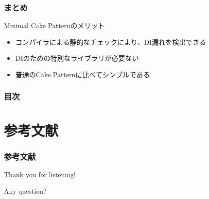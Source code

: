 \begin{frame}
  \frametitle{まとめ}
  
  \begin{block}{Minimal Cake Patternのメリット}
    \begin{itemize}
      \item<2-> コンパイラによる静的なチェックにより、DI漏れを検出できる
      \item<3-> DIのための特別なライブラリが必要ない
      \item<4-> 普通のCake Patternに比べてシンプルである
    \end{itemize}
  \end{block}
\end{frame}

\begin{frame}
  \frametitle{目次}

  \tableofcontents
\end{frame}

\section*{参考文献}
\begin{frame}
  \frametitle{参考文献}

  
  \nocite{*}
  
\end{frame}

\begin{frame}
  \centering
  {\Huge Thank you for listening!}

  \quad \quad

  {\Huge Any question?}
\end{frame}


